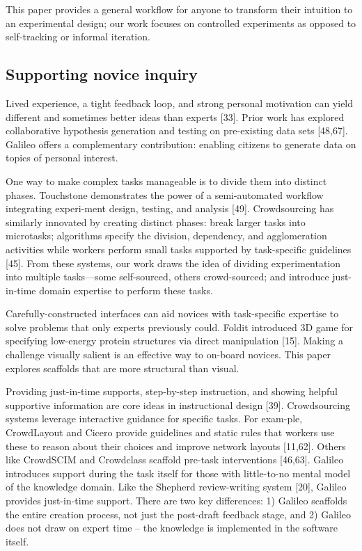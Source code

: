 This paper provides a general workflow for anyone to transform their intuition to an experimental design; our work focuses on controlled experiments as opposed to self-tracking or informal iteration.

\subsection{Supporting novice inquiry}
Lived experience, a tight feedback loop, and strong personal motivation can yield different and sometimes better ideas than experts [33]. Prior work has explored collaborative hypothesis generation and testing on pre-existing data sets [48,67]. Galileo offers a complementary contribution: enabling citizens to generate data on topics of personal interest.

One way to make complex tasks manageable is to divide them into distinct phases. Touchstone demonstrates the power of a semi-automated workflow integrating experi-ment design, testing, and analysis [49]. Crowdsourcing has similarly innovated by creating distinct phases: break larger tasks into microtasks; algorithms specify the division, dependency, and agglomeration activities while workers perform small tasks supported by task-specific guidelines [45]. From these systems, our work draws the idea of dividing experimentation into multiple tasks—some self-sourced, others crowd-sourced; and introduce just-in-time domain expertise to perform these tasks. 

Carefully-constructed interfaces can aid novices with task-specific expertise to solve problems that only experts previously could. Foldit introduced 3D game for specifying low-energy protein structures via direct manipulation [15]. Making a challenge visually salient is an effective way to on-board novices. This paper explores scaffolds that are more structural than visual.

Providing just-in-time supports, step-by-step instruction, and showing helpful supportive information are core ideas in instructional design [39]. Crowdsourcing systems leverage interactive guidance for specific tasks. For exam-ple, CrowdLayout and Cicero provide guidelines and static rules that workers use these to reason about their choices and improve network layouts [11,62]. Others like CrowdSCIM and Crowdclass scaffold pre-task interventions [46,63]. Galileo introduces support during the task itself for those with little-to-no mental model of the knowledge domain. Like the Shepherd review-writing system [20], Galileo provides just-in-time support. There are two key differences: 1) Galileo scaffolds the entire creation process, not just the post-draft feedback stage, and 2) Galileo does not draw on expert time – the knowledge is implemented in the software itself. 

